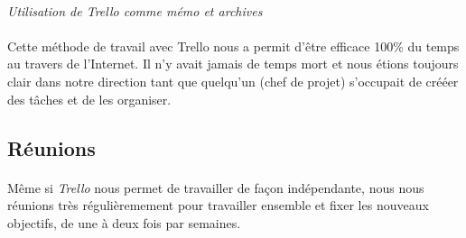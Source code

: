 \paragraph{}
\noindent
{}
\begin{center}
\textit{Utilisation de Trello comme mémo et archives }
\end{center}

\paragraph{}
Cette méthode de travail avec Trello nous a permit d’être efficace 100\% du temps au travers de l’Internet. Il n’y avait jamais de temps mort et nous étions toujours clair dans notre direction tant que quelqu’un (chef de projet) s’occupait de crééer des tâches et de les organiser.

\subsection{Réunions}

\paragraph{}
Même si \textit{Trello} nous permet de travailler de façon indépendante, nous nous réunions très régulièremement pour travailler ensemble et fixer les nouveaux objectifs, de une à deux fois par semaines.

